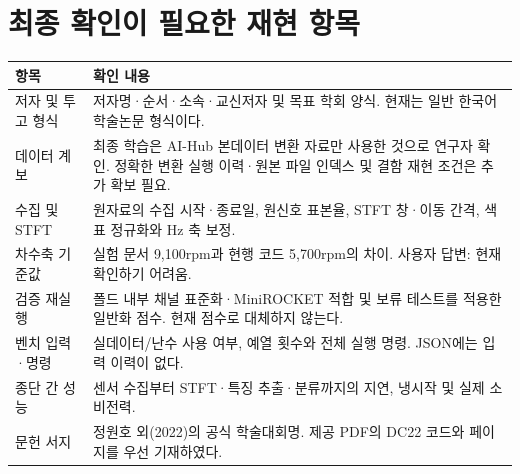 \documentclass[11pt,a4paper]{article}
\begin{document}
\clearpage
\section{최종 확인이 필요한 재현 항목}
\begin{longtable}{p{35mm}p{110mm}}
\toprule 항목 & 확인 내용\\\midrule
저자 및 투고 형식 & 저자명·순서·소속·교신저자 및 목표 학회 양식. 현재는 일반 한국어 학술논문 형식이다.\\
데이터 계보 & 최종 학습은 AI-Hub 본데이터 변환 자료만 사용한 것으로 연구자 확인. 정확한 변환 실행 이력·원본 파일 인덱스 및 결함 재현 조건은 추가 확보 필요.\\
수집 및 STFT & 원자료의 수집 시작·종료일, 원신호 표본율, STFT 창·이동 간격, 색표 정규화와 Hz 축 보정.\\
차수축 기준값 & 실험 문서 9,100rpm과 현행 코드 5,700rpm의 차이. 사용자 답변: 현재 확인하기 어려움.\\
검증 재실행 & 폴드 내부 채널 표준화·MiniROCKET 적합 및 보류 테스트를 적용한 일반화 점수. 현재 점수로 대체하지 않는다.\\
벤치 입력·명령 & 실데이터/난수 사용 여부, 예열 횟수와 전체 실행 명령. JSON에는 입력 이력이 없다.\\
종단 간 성능 & 센서 수집부터 STFT·특징 추출·분류까지의 지연, 냉시작 및 실제 소비전력.\\
문헌 서지 & 정원호 외(2022)의 공식 학술대회명. 제공 PDF의 DC22 코드와 페이지를 우선 기재하였다.\\
\bottomrule
\end{longtable}
\end{document}
